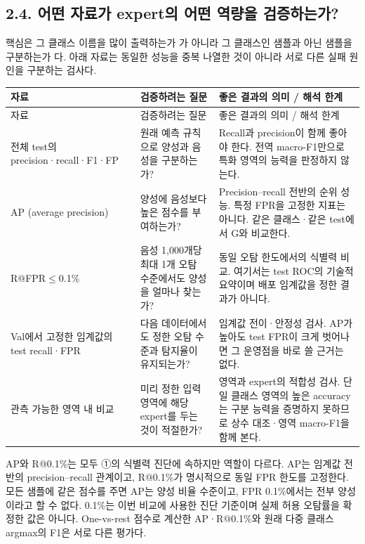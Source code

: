 \subsection*{2.4. 어떤 자료가 expert의 어떤 역량을 검증하는가?}
핵심은 그 클래스 이름을 많이 출력하는가 가 아니라 그 클래스인 샘플과 아닌 샘플을 구분하는가 다. 아래 자료는 동일한 성능을 중복 나열한 것이 아니라 서로 다른 실패 원인을 구분하는 검사다.

\begingroup
\footnotesize
\begin{longtable}{>{\raggedright\arraybackslash}p{}>{\raggedright\arraybackslash}p{}>{\raggedright\arraybackslash}p{}}
\toprule
자료 & 검증하려는 질문 & 좋은 결과의 의미 /\allowbreak{} 해석 한계 \\ \midrule
\endfirsthead
자료 & 검증하려는 질문 & 좋은 결과의 의미 /\allowbreak{} 해석 한계 \\ \midrule
\endhead
{}전체 test의 precision·recall·F1·FP & 원래 예측 규칙으로 양성과 음성을 구분하는가? & Recall과 precision이 함께 좋아야 한다. 전역 macro-F1만으로 특화 영역의 능력을 판정하지 않는다. \\
{}AP (average precision) & 양성에 음성보다 높은 점수를 부여하는가? & Precision–recall 전반의 순위 성능. 특정 FPR을 고정한 지표는 아니다. 같은 클래스·같은 test에서 G와 비교한다. \\
{}R@FPR\ensuremath{\leq}0.1\% & 음성 1,000개당 최대 1개 오탐 수준에서도 양성을 얼마나 찾는가? & 동일 오탐 한도에서의 식별력 비교. 여기서는 test ROC의 기술적 요약이며 배포 임계값을 정한 결과가 아니다. \\
{}Val에서 고정한 임계값의 test recall·FPR & 다음 데이터에서도 정한 오탐 수준과 탐지율이 유지되는가? & 임계값 전이·안정성 검사. AP가 높아도 test FPR이 크게 벗어나면 그 운영점을 바로 쓸 근거는 없다. \\
{}관측 가능한 영역 내 비교 & 미리 정한 입력 영역에 해당 expert를 두는 것이 적절한가? & 영역과 expert의 적합성 검사. 단일 클래스 영역의 높은 accuracy는 구분 능력을 증명하지 못하므로 상수 대조·영역 macro-F1을 함께 본다. \\
\bottomrule
\end{longtable}
\endgroup
AP와 R@0.1\%는 모두 ①의 식별력 진단에 속하지만 역할이 다르다. AP는 임계값 전반의 precision–recall 관계이고, R@0.1\%가 명시적으로 동일 FPR 한도를 고정한다. 모든 샘플에 같은 점수를 주면 AP는 양성 비율 수준이고, FPR 0.1\%에서는 전부 양성이라고 할 수 없다. 0.1\%는 이번 비교에 사용한 진단 기준이며 실제 허용 오탐률을 확정한 값은 아니다. One-vs-rest 점수로 계산한 AP·R@0.1\%와 원래 다중 클래스 argmax의 F1은 서로 다른 평가다.

